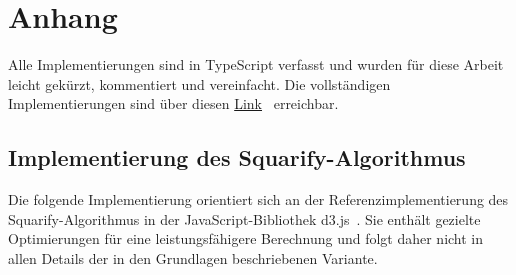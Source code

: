 \chapter{Anhang} \label{chap:anhang}

Alle Implementierungen sind in TypeScript verfasst und wurden für diese Arbeit leicht gekürzt, kommentiert und vereinfacht. Die vollständigen Implementierungen sind über diesen \href{https://github.com/BenediktMehl/master-thesis/tree/main/anhang}{Link}~\cite{anhaenge_github} erreichbar.

\section*{Implementierung des Squarify-Algorithmus} \label{sec:SquarifyImplementation}

Die folgende Implementierung orientiert sich an der Referenzimplementierung des Squarify-Algorithmus in der JavaScript-Bibliothek d3.js~\cite{d3_treemap_github}. Sie enthält gezielte Optimierungen für eine leistungsfähigere Berechnung und folgt daher nicht in allen Details der in den Grundlagen beschriebenen Variante.

